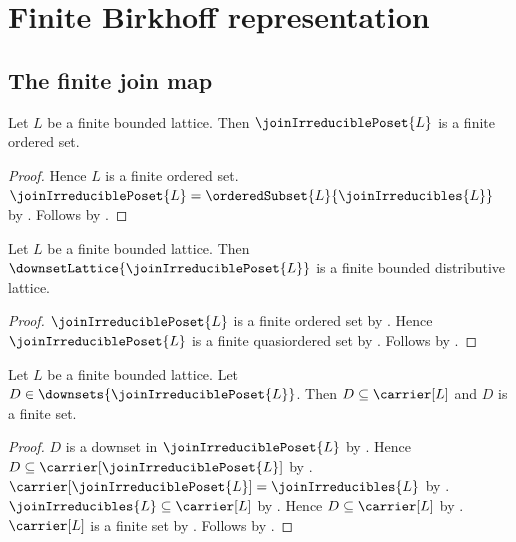 \section{Finite Birkhoff representation}








\subsection{The finite join map}

\begin{proposition}\label{join_irreducible_poset_is_finite}
    Let $L$ be a finite bounded lattice.
    Then $\joinIrreduciblePoset{L}$ is a finite ordered set.
\end{proposition}
\begin{proof}
    Hence $L$ is a finite ordered set.
    $\joinIrreduciblePoset{L}
        =\orderedSubset{L}{\joinIrreducibles{L}}$ by
        .
    Follows by .
\end{proof}

\begin{theorem}\label{finite_birkhoff_downset_lattice}
    Let $L$ be a finite bounded lattice.
    Then $\downsetLattice{\joinIrreduciblePoset{L}}$ is a finite
        bounded distributive lattice.
\end{theorem}
\begin{proof}
    $\joinIrreduciblePoset{L}$ is a finite ordered set by
        .
    Hence $\joinIrreduciblePoset{L}$ is a finite quasiordered set by
        .
    Follows by .
\end{proof}

\begin{proposition}
    \label{downset_of_join_irreducibles_is_finite_carrier_subset}
    Let $L$ be a finite bounded lattice.
    Let $D\in\downsets{\joinIrreduciblePoset{L}}$.
    Then $D\subseteq\carrier[L]$ and $D$ is a finite set.
\end{proposition}
\begin{proof}
    $D$ is a downset in $\joinIrreduciblePoset{L}$ by
        .
    Hence $D\subseteq\carrier[\joinIrreduciblePoset{L}]$ by
        .
    $\carrier[\joinIrreduciblePoset{L}]=\joinIrreducibles{L}$ by
        .
    $\joinIrreducibles{L}\subseteq\carrier[L]$ by
        .
    Hence $D\subseteq\carrier[L]$ by .
    $\carrier[L]$ is a finite set by .
    Follows by .
\end{proof}

